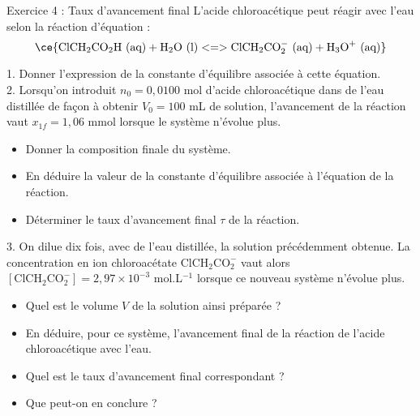 \documentclass[12pt, french]{article}
\begin{document}
\begin{Box2}{Exercice 4 : Taux d’avancement final}
L’acide chloroacétique peut réagir avec l’eau selon la réaction d’équation :
\[
  \ce{
\text{ClCH}_2\text{CO}_2\text{H (aq)} + \text{H}_2\text{O (l)} <=>\text{ClCH}_2\text{CO}_2^- \text{ (aq)} + \text{H}_3\text{O}^+ \text{ (aq)}
  }
\]

1. Donner l’expression de la constante d’équilibre associée à cette équation.\\

2. Lorsqu’on introduit $n_0 = 0,0100$ mol d’acide chloroacétique dans de l’eau distillée de façon à obtenir $V_0 = 100$ mL de solution, l’avancement de la réaction vaut $x_{1f} = 1,06$ mmol lorsque le système n’évolue plus.
   \begin{itemize}
       \item[(a)] Donner la composition finale du système.
       \item[(b)] En déduire la valeur de la constante d’équilibre associée à l’équation de la réaction.
       \item[(c)] Déterminer le taux d’avancement final $\tau$ de la réaction.
   \end{itemize}

3. On dilue dix fois, avec de l’eau distillée, la solution précédemment obtenue. La concentration en ion chloroacétate $\text{ClCH}_2 \text{CO}_2^-$ vaut alors $\left[\text{ClCH}_2\text{CO}_2^-\right] = 2,97 \times 10^{-3}$ mol.L$^{-1}$ lorsque ce nouveau système n’évolue plus.
   \begin{itemize}
       \item[(a)] Quel est le volume $V$ de la solution ainsi préparée ?
       \item[(b)] En déduire, pour ce système, l’avancement final de la réaction de l’acide chloroacétique avec l’eau.
       \item[(c)] Quel est le taux d’avancement final correspondant ?
       \item[(d)] Que peut-on en conclure ?
   \end{itemize}

\end{Box2}
\end{document}

